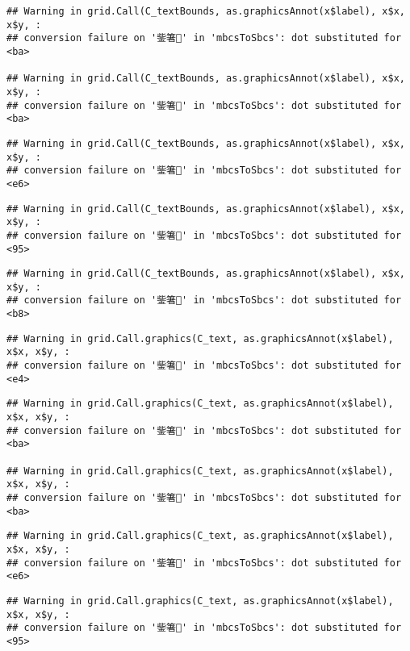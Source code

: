 \documentclass[
]{article}
\begin{document}
\begin{verbatim}
## Warning in grid.Call(C_textBounds, as.graphicsAnnot(x$label), x$x, x$y, :
## conversion failure on '鈭箸' in 'mbcsToSbcs': dot substituted for <ba>

## Warning in grid.Call(C_textBounds, as.graphicsAnnot(x$label), x$x, x$y, :
## conversion failure on '鈭箸' in 'mbcsToSbcs': dot substituted for <ba>
\end{verbatim}

\begin{verbatim}
## Warning in grid.Call(C_textBounds, as.graphicsAnnot(x$label), x$x, x$y, :
## conversion failure on '鈭箸' in 'mbcsToSbcs': dot substituted for <e6>
\end{verbatim}

\begin{verbatim}
## Warning in grid.Call(C_textBounds, as.graphicsAnnot(x$label), x$x, x$y, :
## conversion failure on '鈭箸' in 'mbcsToSbcs': dot substituted for <95>
\end{verbatim}

\begin{verbatim}
## Warning in grid.Call(C_textBounds, as.graphicsAnnot(x$label), x$x, x$y, :
## conversion failure on '鈭箸' in 'mbcsToSbcs': dot substituted for <b8>
\end{verbatim}

\begin{verbatim}
## Warning in grid.Call.graphics(C_text, as.graphicsAnnot(x$label), x$x, x$y, :
## conversion failure on '鈭箸' in 'mbcsToSbcs': dot substituted for <e4>
\end{verbatim}

\begin{verbatim}
## Warning in grid.Call.graphics(C_text, as.graphicsAnnot(x$label), x$x, x$y, :
## conversion failure on '鈭箸' in 'mbcsToSbcs': dot substituted for <ba>

## Warning in grid.Call.graphics(C_text, as.graphicsAnnot(x$label), x$x, x$y, :
## conversion failure on '鈭箸' in 'mbcsToSbcs': dot substituted for <ba>
\end{verbatim}

\begin{verbatim}
## Warning in grid.Call.graphics(C_text, as.graphicsAnnot(x$label), x$x, x$y, :
## conversion failure on '鈭箸' in 'mbcsToSbcs': dot substituted for <e6>
\end{verbatim}

\begin{verbatim}
## Warning in grid.Call.graphics(C_text, as.graphicsAnnot(x$label), x$x, x$y, :
## conversion failure on '鈭箸' in 'mbcsToSbcs': dot substituted for <95>
\end{verbatim}
\end{document}
